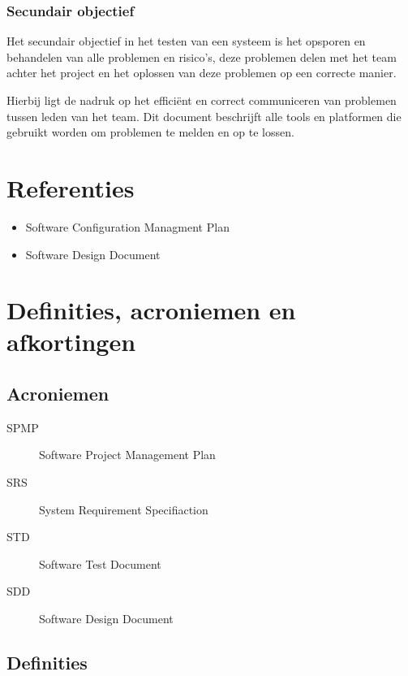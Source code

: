 \documentclass[a4paper]{article}
\begin{document}
\subsubsection{Secundair objectief}

Het secundair objectief in het testen van een systeem is het opsporen en behandelen van alle problemen en risico's, deze problemen delen met het team achter het project en het oplossen van deze problemen op een correcte manier. 

Hierbij ligt de nadruk op het efficiënt en correct communiceren van problemen tussen leden van het team. Dit document beschrijft alle tools en platformen die gebruikt worden om problemen te melden en op te lossen.

\section{Referenties}

\begin{itemize}
\item Software Configuration Managment Plan
\item Software Design Document
\end{itemize}


\section{Definities, acroniemen en afkortingen}
\label{sec:definitions}

\subsection{Acroniemen}

\begin{description}

\item[SPMP] Software Project Management Plan
\item[SRS] System Requirement Specifiaction
\item[STD] Software Test Document
\item[SDD] Software Design Document

\end{description}

\subsection{Definities}
\end{document}
